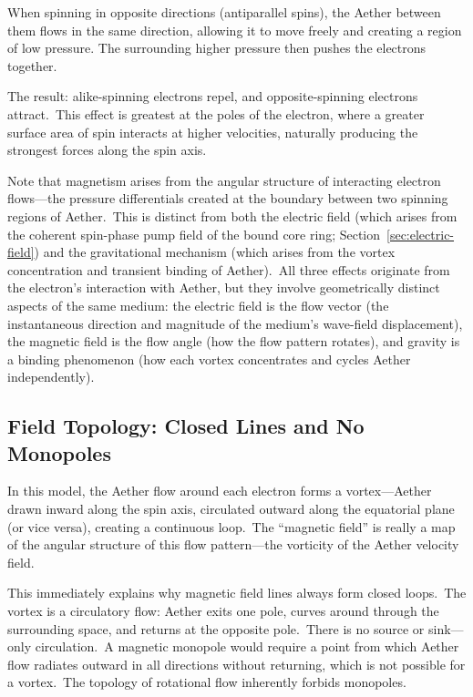 ﻿\documentclass[12pt,letterpaper]{article}
\begin{document}
When spinning in opposite directions (antiparallel spins), the Aether between them flows
in the same direction, allowing it to move freely and creating a region of low pressure.
The surrounding higher pressure then pushes the electrons together.

The result: alike-spinning electrons repel, and opposite-spinning electrons attract.\ This
effect is greatest at the poles of the electron, where a greater surface area of spin
interacts at higher velocities, naturally producing the strongest forces along the spin
axis.

Note that magnetism arises from the angular structure of interacting electron
flows---the pressure differentials created at the boundary between two spinning regions
of Aether.\ This is distinct from both the electric field (which arises from the
coherent spin-phase pump field of the bound core ring;
Section~\ref{sec:electric-field}) and the gravitational mechanism (which arises from
the vortex concentration and transient binding of Aether).\ All three effects originate
from the electron's interaction with Aether, but they involve geometrically distinct
aspects of the same medium: the electric field is the flow vector (the instantaneous
direction and magnitude of the medium's wave-field displacement), the magnetic field
is the flow angle (how the flow pattern rotates), and gravity is a binding phenomenon
(how each vortex concentrates and cycles Aether independently).


\subsection{Field Topology: Closed Lines and No Monopoles}

In this model, the Aether flow around each electron forms a vortex---Aether drawn inward
along the spin axis, circulated outward along the equatorial plane (or vice versa),
creating a continuous loop.\ The ``magnetic field'' is really a map of the angular
structure of this flow pattern---the vorticity of the Aether velocity field.

This immediately explains why magnetic field lines always form closed loops.\ The vortex is
a circulatory flow: Aether exits one pole, curves around through the surrounding space,
and returns at the opposite pole.\ There is no source or sink---only circulation.\ A
magnetic monopole would require a point from which Aether flow radiates outward in all
directions without returning, which is not possible for a vortex.\ The topology of
rotational flow inherently forbids monopoles.
\end{document}
